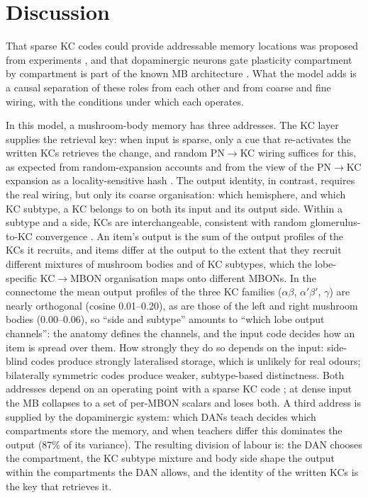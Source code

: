 \documentclass[conference]{IEEEtran}
\begin{document}
\section{Discussion}
That sparse KC codes could provide addressable memory locations was proposed
from experiments \cite{lin2014}, and that dopaminergic neurons gate plasticity
compartment by compartment is part of the known MB architecture
\cite{aso2014a,hige2015}. What the model adds is a causal separation of these
roles from each other and from coarse and fine wiring, with the conditions
under which each operates.

In this model, a mushroom-body memory has three addresses. The KC layer supplies
the retrieval key: when input is sparse, only a cue that re-activates the
written KCs retrieves the change, and random PN$\rightarrow$KC wiring suffices
for this, as expected from random-expansion accounts
\cite{caron2013,litwinkumar2017} and from the view of the PN$\rightarrow$KC
expansion as a locality-sensitive hash \cite{dasgupta2017}. The output identity, in contrast, requires the
real wiring, but only its coarse organisation: which hemisphere, and which KC
subtype, a KC belongs to on both its input and its output side. Within a
subtype and a side, KCs are interchangeable, consistent with random
glomerulus-to-KC convergence \cite{caron2013}. An item's output is the sum of
the output profiles of the KCs it recruits, and items differ at the output to
the extent that they recruit different mixtures of mushroom bodies and of KC
subtypes, which the lobe-specific KC$\rightarrow$MBON organisation
\cite{aso2014a,li2020} maps onto different MBONs. In the connectome the mean
output profiles of the three KC families ($\alpha\beta$, $\alpha'\beta'$,
$\gamma$) are nearly orthogonal (cosine 0.01--0.20), as are those of the left
and right mushroom bodies (0.00--0.06), so ``side and subtype'' amounts to
``which lobe output channels'': the anatomy defines the channels, and the input
code decides how an item is spread over them. How strongly they do so
depends on the input: side-blind codes produce strongly lateralised storage,
which is unlikely for real odours; bilaterally symmetric codes produce weaker,
subtype-based distinctness. Both addresses depend on an operating point with a
sparse KC code \cite{honegger2011,lin2014}; at dense input the MB collapses to
a set of per-MBON scalars and loses both. A third address is supplied by the
dopaminergic system: which DANs teach decides which compartments store the
memory, and when teachers differ this dominates the output (87\% of its
variance). The resulting division of labour is: the DAN chooses the
compartment, the KC subtype mixture and body side shape the output within the
compartments the DAN allows, and the identity of the written KCs is the key
that retrieves it.
\end{document}
